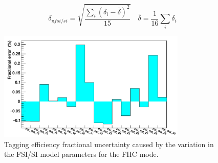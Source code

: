 \begin{equation}
\delta_{\pi f s i / s i}=\sqrt{\frac{\sum_i\left(\delta_i-\bar{\delta}\right)^2}{15}} \quad \bar{\delta}=\frac{1}{16} \sum_i \delta_i
\label{eq:std_dev_fsisi}
\end{equation}


\begin{figure}[!htb]
\centering 
    \includegraphics[width=0.8\textwidth]{Figures/fsisi_uncertainty.png}
\caption{Tagging efficiency fractional uncertainty caused by the variation in the FSI/SI model parameters for the FHC mode.}
\label{fig:fsisiuncertainty}
\end{figure}


